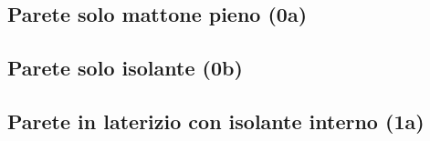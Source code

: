 \documentclass[a4paper,10pt]{report}
\begin{document}

\tableofcontents
\clearpage
\begingroup
    \let\clearpage\relax        %
        \listoftables
        \listoffigures
\endgroup
%



\clearpage
\begin{landscape}
        \subsection*{Parete solo mattone pieno (0a)}
                \begin{minipage}[c]{0.3\linewidth}
                        
                \end{minipage}
                \hspace*{0.15\linewidth}
                \begin{minipage}[c]{0.55\linewidth}
                            
                \end{minipage}
        \subsection*{Parete solo isolante (0b)}
                \begin{minipage}[c]{0.3\linewidth}
                        
                \end{minipage}
                \hspace*{0.15\linewidth}
                \begin{minipage}[c]{0.55\linewidth}
                            
                \end{minipage}
        \subsection*{Parete in laterizio con isolante interno (1a)}
                \begin{minipage}[c]{0.3\linewidth}
                        
                \end{minipage}
                \hspace*{0.15\linewidth}
                \begin{minipage}[c]{0.55\linewidth}
                            
                \end{minipage}

\end{landscape}
\end{document}
